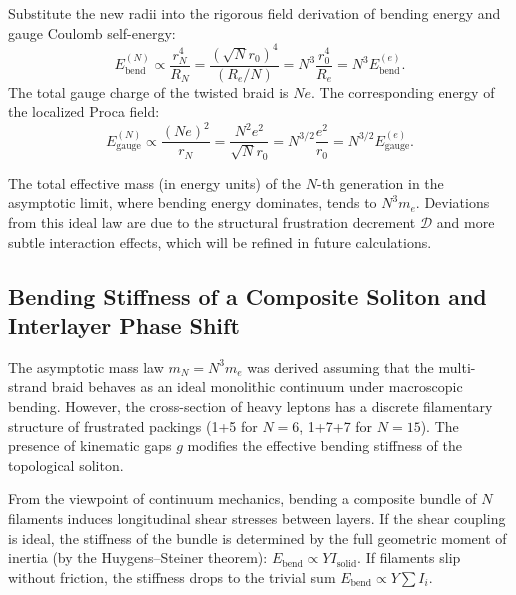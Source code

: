 \documentclass[11pt,a4paper]{article}
\begin{document}
Substitute the new radii into the rigorous field derivation of bending energy and gauge Coulomb self-energy:
\begin{equation}
E_{\text{bend}}^{(N)} \propto \frac{r_N^4}{R_N} = \frac{(\sqrt{N} r_0)^4}{(R_e / N)} = N^3 \frac{r_0^4}{R_e} = N^3 E_{\text{bend}}^{(e)}.
\end{equation}
The total gauge charge of the twisted braid is $N e$. The corresponding energy of the localized Proca field:
\begin{equation}
E_{\text{gauge}}^{(N)} \propto \frac{(Ne)^2}{r_N} = \frac{N^2 e^2}{\sqrt{N} r_0} = N^{3/2} \frac{e^2}{r_0} = N^{3/2} E_{\text{gauge}}^{(e)}.
\end{equation}

The total effective mass (in energy units) of the $N$-th generation in the asymptotic limit, where bending energy dominates, tends to $N^3 m_e$. Deviations from this ideal law are due to the structural frustration decrement $\mathcal{D}$ and more subtle interaction effects, which will be refined in future calculations.

\subsection{Bending Stiffness of a Composite Soliton and Interlayer Phase Shift}
The asymptotic mass law $m_N = N^3 m_e$ was derived assuming that the multi-strand braid behaves as an ideal monolithic continuum under macroscopic bending. However, the cross-section of heavy leptons has a discrete filamentary structure of frustrated packings (1+5 for $N=6$, 1+7+7 for $N=15$). The presence of kinematic gaps $g$ modifies the effective bending stiffness of the topological soliton.

From the viewpoint of continuum mechanics, bending a composite bundle of $N$ filaments induces longitudinal shear stresses between layers. If the shear coupling is ideal, the stiffness of the bundle is determined by the full geometric moment of inertia (by the Huygens–Steiner theorem): $E_{\text{bend}} \propto Y I_{\text{solid}}$. If filaments slip without friction, the stiffness drops to the trivial sum $E_{\text{bend}} \propto Y \sum I_i$.
\end{document}
